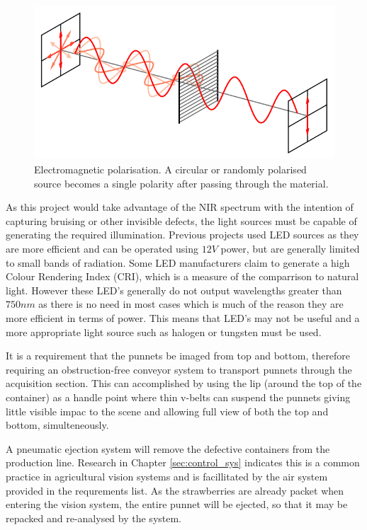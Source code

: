 \documentclass[fleqn,twoside]{article}
\begin{document}
\begin{figure}[h]
	\centering
	\includegraphics[width=.8\linewidth]{polarization.png}
	\caption{Electromagnetic polarisation. A circular or randomly polarised source becomes a single polarity after passing through the material.}
	\label{fig:polarization}
\end{figure}%

As this project would take advantage of the NIR spectrum with the intention of capturing bruising or other invisible defects, the light sources must be capable of generating the required illumination. Previous projects used LED sources as they are more efficient and can be operated using $12V$ power, but are generally limited to small bands of radiation. Some LED manufacturers claim to generate a high Colour Rendering Index (CRI), which is a measure of the comparrison to natural light. However these LED's generally do not output wavelengths greater than $750nm$ as there is no need in most cases which is much of the reason they are more efficient in terms of power. This means that LED's may not be useful and a more appropriate light source such as halogen or tungsten must be used.

It is a requirement that the punnets be imaged from top and bottom, therefore requiring an obstruction-free conveyor system to transport punnets through the acquisition section. This can accomplished by using the lip (around the top of the container) as a handle point where thin v-belts can suspend the punnets giving little visible impac to the scene and allowing full view of both the top and bottom, simulteneously.

A pneumatic ejection system will remove the defective containers from the production line. Research in Chapter \ref{sec:control_sys} indicates this is a common practice in agricultural vision systems and is facillitated by the air system provided in the requrements list. As the strawberries are already packet when entering the vision system, the entire punnet will be ejected, so that it may be repacked and re-analysed by the system.
\end{document}

